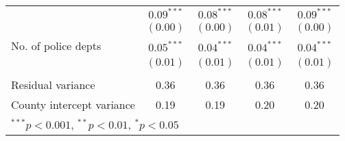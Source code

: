 \begin{table}
\begin{center}
\begin{tabular}{l c c c c }
{Year                              & $0.09^{***}$  & $0.08^{***}$  & $0.08^{***}$  & $0.09^{***}$  \\
                                  & $(0.00)$      & $(0.00)$      & $(0.01)$      & $(0.00)$      \\
No. of police depts               & $0.05^{***}$  & $0.04^{***}$  & $0.04^{***}$  & $0.04^{***}$  \\
                                  & $(0.01)$      & $(0.01)$      & $(0.01)$      & $(0.01)$      \\
}
    \\
\hline
Residual variance                 & 0.36          & 0.36          & 0.36          & 0.36          \\
County intercept variance         & 0.19          & 0.19          & 0.20          & 0.20          \\
\hline
\multicolumn{5}{l}{\scriptsize{$^{***}p<0.001$, $^{**}p<0.01$, $^*p<0.05$}}
\end{tabular}
\end{center}
\end{table}
